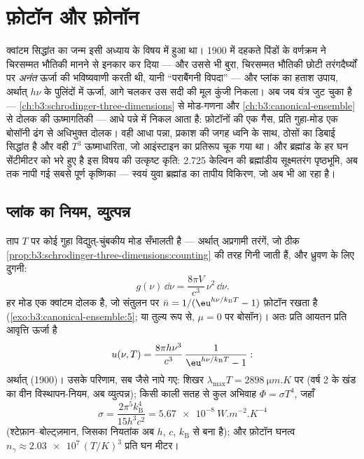 \chapter{फ़ोटॉन और फ़ोनॉन}\label{ch:b3:photons-phonons}

क्वांटम सिद्धांत का जन्म इसी अध्याय के विषय में हुआ था। 1900 में
दहकते पिंडों के वर्णक्रम ने चिरसम्मत भौतिकी मानने से इनकार कर दिया ---
और उससे भी बुरा, चिरसम्मत भौतिकी छोटी तरंगदैर्घ्यों पर \emph{अनंत}
ऊर्जा की भविष्यवाणी करती थी, यानी ``पराबैंगनी विपदा'' --- और प्लांक का
हताश उपाय, अर्थात् $h\nu$ के पुलिंदों में ऊर्जा, आगे चलकर उस
सदी की मूल कुंजी निकला। अब जब यंत्र जुट चुका है ---
\cref{ch:b3:schrodinger-three-dimensions} से मोड-गणना और
\cref{ch:b3:canonical-ensemble} से दोलक की ऊष्मागतिकी ---  आधे पन्ने में निकल आता है: फ़ोटॉनों की एक गैस, प्रति गुहा-मोड एक
बोसॉनी ढंग से अधिभुक्त दोलक। वही आधा पन्ना, प्रकाश की जगह ध्वनि के
साथ, ठोसों का डिबाई सिद्धांत है और वही $T^3$ ऊष्माधारिता, जो
आइंस्टाइन का प्रतिरूप चूक गया था। और ब्रह्मांड के हर घन सेंटीमीटर को
भरे हुए है इस विषय की उत्कृष्ट कृति: 2.725 केल्विन की ब्रह्मांडीय
सूक्ष्मतरंग पृष्ठभूमि, अब तक नापी गई सबसे पूर्ण कृष्णिका --- स्वयं
युवा ब्रह्मांड का तापीय विकिरण, जो अब भी आ रहा है।

\section{प्लांक का नियम, व्युत्पन्न}

\begin{theorem}[कृष्णिका वर्णक्रम]\label{thm:b3:photons-phonons:planck}
ताप $T$ पर कोई गुहा विद्युत्-चुंबकीय मोड सँभालती है --- अर्थात्
अप्रगामी तरंगें, जो ठीक
\cref{prop:b3:schrodinger-three-dimensions:counting} की तरह गिनी
जाती हैं, और ध्रुवण के लिए दुगनी:
\[
g(\nu)\,\dd\nu = \frac{8\pi V}{c^3}\,\nu^2\,\dd\nu .
\]
हर मोड एक क्वांटम दोलक है, जो संतुलन पर
$\bar n = 1/(\eu^{h\nu/k_{\text{B}}T} - 1)$ फ़ोटॉन रखता है
(\cref{exo:b3:canonical-ensemble:5}; या तुल्य रूप से, $\mu =
0$ पर बोसॉन)। अतः प्रति आयतन प्रति आवृत्ति ऊर्जा है
\[
u(\nu, T) = \frac{8\pi h\nu^3}{c^3}\,
\frac{1}{\eu^{h\nu/k_{\text{B}}T} - 1} :
\]
अर्थात् \emph{} (1900)। उसके परिणाम, सब जैसे नापे गए:
शिखर $\lambda_{\max}T = \qty{2898}{\micro m.K}$ पर (वर्ष 2 के खंड
का वीन विस्थापन-नियम, अब व्युत्पन्न); किसी काली सतह से कुल अभिवाह
$\Phi = \sigma T^4$, जहाँ
\[
\sigma = \frac{2\pi^5k_{\text{B}}^4}{15h^3c^2}
 = \qty{5.67e-8}{W.m^{-2}.K^{-4}}
\]
(श्टेफ़ान--बोल्ट्ज़मान, जिसका नियतांक अब $h$, $c$,
$k_{\text{B}}$ से बना है); और फ़ोटॉन घनत्व $n_\gamma \approx
\num{2.03e7}\,(T/\unit{K})^3$ प्रति घन मीटर।
\end{theorem}

